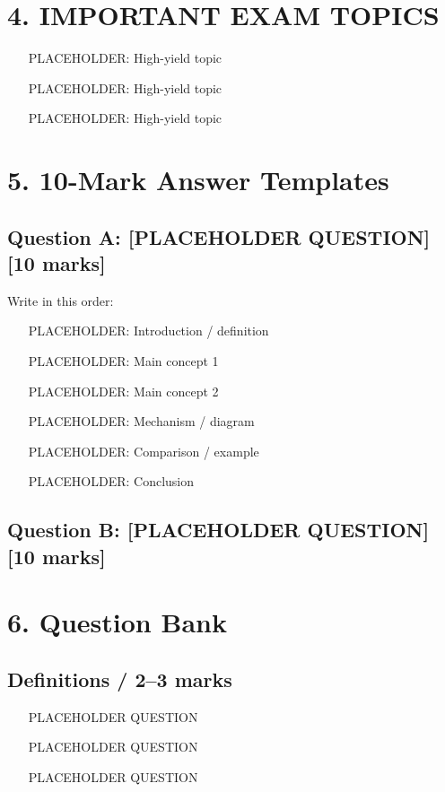 \documentclass[11pt,a4paper]{article}
\newcommand{\mkmarks}[1]{\hfill\textbf{[#1 marks]}}
\begin{document}
\section{4. IMPORTANT EXAM TOPICS}

\begin{itemize}
    \item [PLACEHOLDER: High-yield topic]
    \item [PLACEHOLDER: High-yield topic]
    \item [PLACEHOLDER: High-yield topic]
\end{itemize}

\section{5. 10-Mark Answer Templates}

\subsection{Question A: [PLACEHOLDER QUESTION] \mkmarks{10}}
\begin{answerbox}
Write in this order:
\begin{enumerate}
    \item [PLACEHOLDER: Introduction / definition]
    \item [PLACEHOLDER: Main concept 1]
    \item [PLACEHOLDER: Main concept 2]
    \item [PLACEHOLDER: Mechanism / diagram]
    \item [PLACEHOLDER: Comparison / example]
    \item [PLACEHOLDER: Conclusion]
\end{enumerate}
\end{answerbox}

\subsection{Question B: [PLACEHOLDER QUESTION] \mkmarks{10}}
\begin{answerbox}
\end{answerbox}

\section{6. Question Bank}

\subsection*{Definitions / 2--3 marks}
\begin{enumerate}
    \item [PLACEHOLDER QUESTION]
    \item [PLACEHOLDER QUESTION]
    \item [PLACEHOLDER QUESTION]
\end{enumerate}
\end{document}
